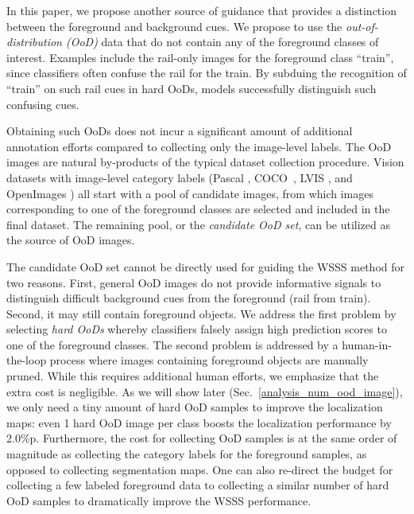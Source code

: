 \documentclass[10pt,twocolumn,letterpaper]{article}
\begin{document}
In this paper, we propose another source of guidance that provides a distinction between the foreground and background cues. 
We propose to use the \textit{out-of-distribution (OoD)} data that do not contain any of the foreground classes of interest.
Examples include the rail-only images for the foreground class ``train'', since classifiers often confuse the rail for the train. 
By subduing the recognition of ``train'' on such rail cues in hard OoDs, models successfully distinguish such confusing cues.





Obtaining such OoDs does not incur a significant amount of additional annotation efforts compared to collecting only the image-level labels.
The OoD images are natural by-products of the typical dataset collection procedure. Vision datasets with image-level category labels (\eg Pascal \cite{everingham2010pascal}, COCO~\cite{lin2014microsoft}, LVIS \cite{gupta2019lvis}, and OpenImages \cite{kuznetsova2020open}) all start with a pool of candidate images, from which images corresponding to one of the foreground classes are selected and included in the final dataset. The remaining pool, or the \textit{candidate OoD set}, can be utilized as the source of OoD images. 

The candidate OoD set cannot be directly used for guiding the WSSS method for two reasons. First, general OoD images do not provide informative signals to distinguish difficult background cues from the foreground (\eg rail from train). Second, it may still contain foreground objects. 
We address the first problem by selecting \textit{hard OoDs} whereby classifiers falsely assign high prediction scores to one of the foreground classes.
The second problem is addressed by a human-in-the-loop process where images containing foreground objects are manually pruned. While this requires additional human efforts, we emphasize that the extra cost is negligible. As we will show later (Sec.~\ref{analysis_num_ood_image}), we only need a tiny amount of hard OoD samples to improve the localization maps: even 1 hard OoD image per class boosts the localization performance by 2.0\%p. 
Furthermore, the cost for collecting OoD samples is at the same order of magnitude as collecting the category labels for the foreground samples, as opposed to collecting \eg segmentation maps. 
One can also re-direct the budget for collecting a few labeled foreground data to collecting a similar number of hard OoD samples to dramatically improve the WSSS performance.
\end{document}
